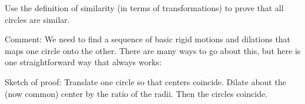 \documentclass[nooutcomes]{ximera}
\begin{document}
%

%

\begin{question}
Use the definition of similarity (in terms of transformations) to prove that all circles are similar.  
\begin{freeResponse}
\begin{hint}
Comment: We need to find a sequence of basic rigid motions and dilations that maps one circle onto the other.  There are many ways to go about this, but here is one straightforward way that always works: 

Sketch of proof:  Translate one circle so that centers coincide.  Dilate about the (now common) center by the ratio of the radii.  Then the circles coincide.  
\end{hint}
\end{freeResponse}
\end{question}
\end{document}

